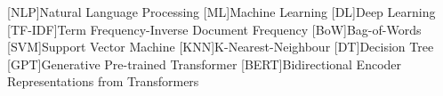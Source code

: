 [NLP]{Natural Language Processing}
[ML]{Machine Learning}
[DL]{Deep Learning}
[TF-IDF]{Term Frequency-Inverse Document Frequency}
[BoW]{Bag-of-Words}
[SVM]{Support Vector Machine}
[KNN]{K-Nearest-Neighbour}
[DT]{Decision Tree}
[GPT]{Generative Pre-trained Transformer}
[BERT]{Bidirectional Encoder Representations from Transformers}

